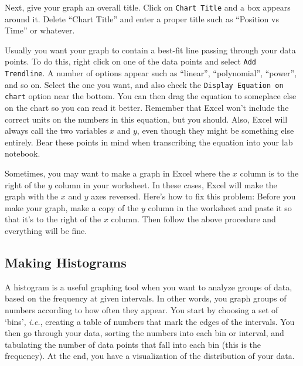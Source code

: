 Next, give your graph an overall title. Click on {\tt Chart Title} and a box 
appears around it. Delete ``Chart Title'' and enter a proper title such as 
``Position vs Time'' or whatever.
\vspace{0.5cm}

Usually you want your graph to contain a best-fit line passing
through your data points.  To do this, right click on one of the data points 
and select {\tt Add Trendline}. A number of options appear such as 
``linear'', ``polynomial'', ``power'', and so on.  Select the one you want, 
and also check the {\tt Display Equation on chart} option near the bottom. 
You can then drag the equation to someplace else on the chart so you can read 
it better. Remember that Excel won't include the correct units on the numbers 
in this equation, but you should.  Also, Excel will always call the two 
variables $x$ and $y$, even though they might be something else entirely. Bear 
these points in mind when transcribing the equation into your lab notebook.
\vspace{0.5cm}



Sometimes, you may want to make a graph in Excel where the $x$ column
is to the right of the $y$ column in your worksheet.  In these cases,
Excel will make the graph with the $x$ and $y$ axes reversed. Here's how 
to fix this problem:  Before you make your graph,  make a copy of the $y$ 
column in the worksheet and paste it so that it's to the right of the $x$ 
column.  Then follow the above procedure and everything will be fine.


\subsection{Making Histograms}

A histogram is a useful graphing tool when you want to analyze groups of data, based on the frequency at given intervals. 
In other words, you graph groups of numbers according to how often they appear.
You start by choosing a set of `bins', {\it i.e.}, creating a table of numbers that mark the edges of the intervals.
You then go through your data, sorting the numbers into each bin or interval, and tabulating the number of data points that fall into each bin (this is the 
frequency).
At the end, you have a visualization of the distribution of your data.   


